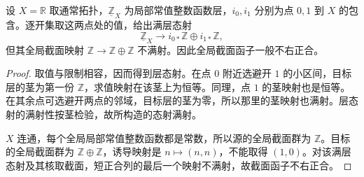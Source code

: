 \begin{proposition}\label{b4:prop:C-sheaf-global-lift-obstruction}
	设 \(X=\mathbb R\) 取通常拓扑，\(\underline{\mathbb Z}_X\) 为局部常值整数函数层，\(i_0,i_1\) 分别为点 \(0,1\) 到 \(X\) 的包含。逐开集取这两点处的值，给出满层态射
	\[
		\underline{\mathbb Z}_X\longrightarrow i_{0*}\mathbb Z\oplus i_{1*}\mathbb Z,
	\]
	但其全局截面映射 \(\mathbb Z\to\mathbb Z\oplus\mathbb Z\) 不满射。因此全局截面函子一般不右正合。
\end{proposition}
\begin{proof}
	取值与限制相容，因而得到层态射。在点 \(0\) 附近选避开 \(1\) 的小区间，目标层的茎为第一份 \(\mathbb Z\)，求值映射在该茎上为恒等。同理，点 \(1\) 的茎映射也是恒等。在其余点可选避开两点的邻域，目标层的茎为零，所以那里的茎映射也满射。层态射的满射性按茎检验，故所构造的态射满射。

	\(X\) 连通，每个全局局部常值整数函数都是常数，所以源的全局截面群为 \(\mathbb Z\)。目标的全局截面群为 \(\mathbb Z\oplus\mathbb Z\)，诱导映射是 \(n\mapsto(n,n)\)，不能取得 \((1,0)\)。对该满层态射及其核取截面，短正合列的最后一个映射不满射，故截面函子不右正合。
\end{proof}

